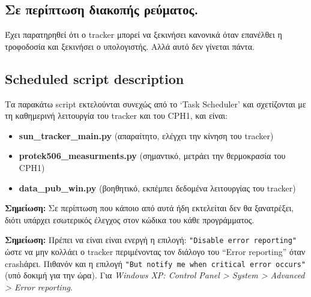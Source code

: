 \documentclass[
  a4paper,
  twoside,
  titlepage,
  11pt]{article}
\providecommand{\tightlist}{%
  \setlength{\itemsep}{0pt}\setlength{\parskip}{0pt}}
\numberwithin{equation}{section}
\numberwithin{figure}{section}
\numberwithin{table}{section}
\begin{document}
\vspace{-1.05\baselineskip}

\hypertarget{ux3c3ux3b5-ux3c0ux3b5ux3c1ux3afux3c0ux3c4ux3c9ux3c3ux3b7-ux3b4ux3b9ux3b1ux3baux3bfux3c0ux3aeux3c2-ux3c1ux3b5ux3cdux3bcux3b1ux3c4ux3bfux3c2.}{%
\subsection*{Σε περίπτωση διακοπής ρεύματος.}\label{ux3c3ux3b5-ux3c0ux3b5ux3c1ux3afux3c0ux3c4ux3c9ux3c3ux3b7-ux3b4ux3b9ux3b1ux3baux3bfux3c0ux3aeux3c2-ux3c1ux3b5ux3cdux3bcux3b1ux3c4ux3bfux3c2.}}

\vspace{-0.6\baselineskip}

Έχει παρατηρηθεί ότι ο tracker μπορεί να ξεκινήσει κανονικά όταν επανέλθει η τροφοδοσία και ξεκινήσει ο υπολογιστής. Αλλά αυτό δεν γίνεται πάντα.

\vspace{-1\baselineskip}

\hypertarget{scheduled-script-description}{%
\subsection*{Scheduled script description}\label{scheduled-script-description}}

\vspace{-0.7\baselineskip}

Τα παρακάτω script εκτελούνται συνεχώς από το `Task Scheduler' και σχετίζονται με τη καθημερινή λειτουργία του tracker και του CPH1, και είναι:

\begin{itemize}
\tightlist
\item
  \textbf{sun\_tracker\_main.py} (απαραίτητο, ελέγχει την κίνηση του tracker)
\item
  \textbf{protek506\_measurments.py} (σημαντικό, μετράει την θερμοκρασία του CPH1)
\item
  \textbf{data\_pub\_win.py} (βοηθητικό, εκπέμπει δεδομένα λειτουργίας του tracker)
\end{itemize}

\textbf{Σημείωση:} Σε περίπτωση που κάποιο από αυτά ήδη εκτελείται δεν θα ξανατρέξει, διότι υπάρχει εσωτερικός έλεγχος στον κώδικα του κάθε προγράμματος.

\textbf{Σημείωση:} Πρέπει να είναι είναι ενεργή η επιλογή: \texttt{"Disable\ error\ reporting"} ώστε να μην κολλάει ο tracker περιμένοντας τον διάλογο του ``Error reporting'' όταν crashάρει. Πιθανόν και η επιλογή \texttt{"But\ notify\ me\ when\ critical\ error\ occurs"} (υπό δοκιμή για την ώρα). Για \emph{Windows XP: Control Panel \textgreater{} System \textgreater{} Advanced \textgreater{} Error reporting}.
\end{document}
